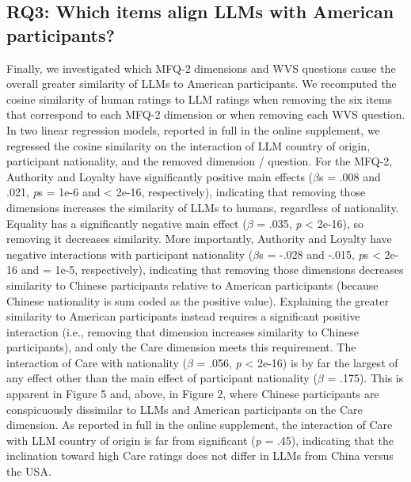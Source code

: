\documentclass[11pt,a4paper]{article}
\begin{document}
\subsection{RQ3: Which items align LLMs with American participants?}
 
Finally, we investigated which MFQ-2 dimensions and WVS questions cause the overall greater similarity of LLMs to American participants. We recomputed the cosine similarity of human ratings to LLM ratings when removing the six items that correspond to each MFQ-2 dimension or when removing each WVS question. In two linear regression models, reported in full in the online supplement, we regressed the cosine similarity on the interaction of LLM country of origin, participant nationality, and the removed dimension / question. For the MFQ-2, Authority and Loyalty have significantly positive main effects ($\beta$s = .008 and .021, \textit{p}s = 1e-6 and < 2e-16, respectively), indicating that removing those dimensions increases the similarity of LLMs to humans, regardless of nationality. Equality has a significantly negative main effect ($\beta$ = .035, \textit{p} < 2e-16), so removing it decreases similarity. 
More importantly, Authority and Loyalty have negative interactions with participant nationality ($\beta$s = -.028 and -.015, \textit{p}s < 2e-16 and = 1e-5, respectively), indicating that removing those dimensions decreases similarity to Chinese participants relative to American participants (because Chinese nationality is sum coded as the positive value). Explaining the greater similarity to American participants instead requires a significant positive interaction (i.e., removing that dimension increases similarity to Chinese participants), and only the Care dimension meets this requirement. The interaction of Care with nationality ($\beta$ = .056, \textit{p} < 2e-16) is by far the largest of any effect other than the main effect of participant nationality ($\beta$ = .175). This is apparent in Figure 5 and, above, in Figure 2, where Chinese participants are conspicuously dissimilar to LLMs and American participants on the Care dimension. As reported in full in the online supplement, the interaction of Care with LLM country of origin is far from significant (\textit{p} = .45), indicating that the inclination toward high Care ratings does not differ in LLMs from China versus the USA.\\
\end{document}
